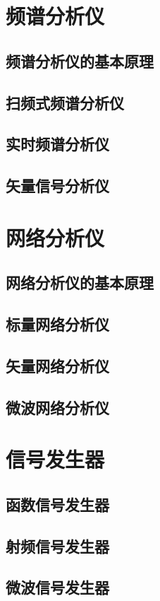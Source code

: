 \documentclass[12pt,UTF8]{ctexbook}
\begin{document}
\chapter{频谱分析仪}
\section{频谱分析仪的基本原理}
\section{扫频式频谱分析仪}
\section{实时频谱分析仪}
\section{矢量信号分析仪}

\chapter{网络分析仪}
\section{网络分析仪的基本原理}
\section{标量网络分析仪}
\section{矢量网络分析仪}
\section{微波网络分析仪}

\chapter{信号发生器}
\section{函数信号发生器}
\section{射频信号发生器}
\section{微波信号发生器}
\end{document}
